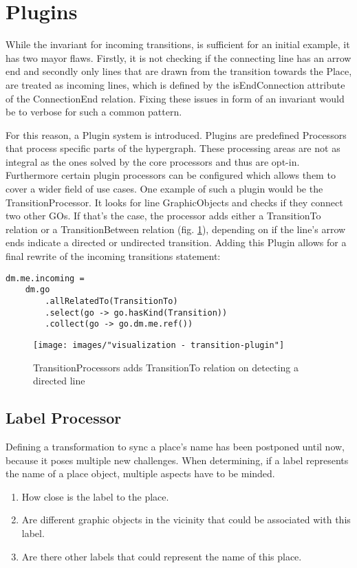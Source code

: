 \section{Plugins}

While the invariant for incoming transitions, is sufficient for an initial example, it has two mayor flaws. Firstly, it is not checking if the connecting line has an arrow end and secondly only lines that are drawn from the transition towards the Place, are treated as incoming lines, which is defined by the isEndConnection attribute of the ConnectionEnd relation. Fixing these issues in form of an invariant would be to verbose for such a common pattern.

For this reason, a Plugin system is introduced. Plugins are predefined Processors that process specific parts of the hypergraph. These processing areas are not as integral as the ones solved by the core processors and thus are opt-in. Furthermore certain plugin processors can be configured which allows them to cover a wider field of use cases. One example of such a plugin would be the TransitionProcessor. It looks for line GraphicObjects and checks if they connect two other GOs. If that's the case, the processor adds either a TransitionTo relation or a TransitionBetween relation (fig. \ref{fig:transition-plugin}), depending on if the line's arrow ends indicate a directed or undirected transition. Adding this Plugin allows for a final rewrite of the incoming transitions statement:

\begin{lstlisting}[language=OCL]
dm.me.incoming = 
    dm.go
        .allRelatedTo(TransitionTo)
        .select(go -> go.hasKind(Transition))
        .collect(go -> go.dm.me.ref())
\end{lstlisting}

\begin{figure}[ht]
\centering
\texttt{[image: images/"visualization - transition-plugin"]}
\caption{TransitionProcessors adds TransitionTo relation on detecting a directed line}
\label{fig:transition-plugin}
\end{figure}



\subsection{Label Processor}

Defining a transformation to sync a place's name has been postponed until now, because it poses multiple new challenges. When determining, if a label represents the name of a place object, multiple aspects have to be minded. 
\begin{enumerate}
  \item How close is the label to the place.
  \item Are different graphic objects in the vicinity that could be associated with this label.
  \item Are there other labels that could represent the name of this place.
\end{enumerate}

